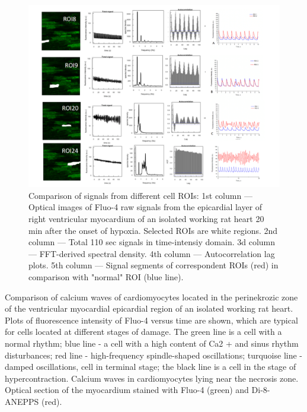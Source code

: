 \documentclass{biophys-new}
\begin{document}
\begin{figure}
    \includegraphics[width=0.9\linewidth]{fig5.png}
    \caption{Comparison of signals from different cell ROIs: 1st column --- Optical images of Fluo-4 raw signals from the epicardial layer of right ventricular myocardium of an isolated working rat heart 20 min after the onset of hypoxia. Selected ROIs are white regions. 2nd column --- Total 110 sec signals in time-intensiy domain. 3d column --- FFT-derived spectral density. 4th column --- Autocorrelation lag plots. 5th column --- Signal segments of correspondent ROIs (red) in comparison with "normal" ROI (blue line). }
    \label{fig:fig5}
\end{figure}



Comparison of calcium waves of cardiomyocytes located in the perinekrozic zone of the ventricular myocardial epicardial region of an isolated working rat heart.
Plots of fluorescence intensity of Fluo-4 versus time are shown, which are typical for cells located at different stages of damage.
The green line is a cell with a normal rhythm; blue line - a cell with a high content of Ca2 + and sinus rhythm disturbances; red line - high-frequency spindle-shaped oscillations; turquoise line - damped oscillations, cell in terminal stage; the black line is a cell in the stage of hypercontraction.
Calcium waves in cardiomyocytes lying near the necrosis zone.
Optical section of the myocardium stained with Fluo-4 (green) and Di-8-ANEPPS (red).
\end{document}
